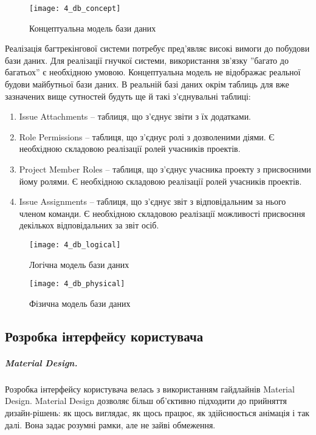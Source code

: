\documentclass[../main.tex]{subfiles}
\begin{document}
\begin{figure}[H]
	\centering
	\texttt{[image: 4\_db\_concept]}
	\caption{Концептуальна модель бази даних}
\end{figure}

Реалізація багтрекінгової системи потребує пред'являє високі вимоги до побудови бази даних. Для реалізації гнучкої системи, використання зв'язку ''багато до багатьох'' є необхідною умовою. Концептуальна модель не відображає реальної будови майбутньої бази даних. В реальній базі даних окрім таблиць для вже зазначених вище сутностей будуть ще й такі з'єднувальні таблиці:

\begin{enumerate}
	\item Issue Attachments -- таблиця, що з'єднує звіти з їх додатками.
	\item Role Permissions -- таблиця, що з'єднує ролі з дозволеними діями. Є необхідною складовою реалізації ролей учасників проектів.
	\item Project Member Roles -- таблиця, що з'єднує учасника проекту з присвоєними йому ролями. Є необхідною складовою реалізації ролей учасників проектів.
	\item Issue Assignments -- таблиця, що з'єднує звіт з відповідальним за нього членом команди. Є необхідною складовою реалізації можливості присвоєння декількох відповідальних за звіт осіб.
\end{enumerate}

\begin{figure}[H]
	\centering
	\texttt{[image: 4\_db\_logical]}
	\caption{Логічна модель бази даних}
\end{figure}

\begin{figure}[H]
	\centering
	\texttt{[image: 4\_db\_physical]}
	\caption{Фізична модель бази даних}
	\label{db_physical}
\end{figure}

\subsection{Розробка інтерфейсу користувача}

\subparagraph{Material Design.}

Розробка інтерфейсу користувача велась з використанням гайдлайнів Material Design.\cite{material_design} Material Design дозволяє більш об'єктивно підходити до прийняття дизайн-рішень: як щось виглядає, як щось працює, як здійснюється анімація і так далі. Вона задає розумні рамки, але не зайві обмеження.
\end{document}
